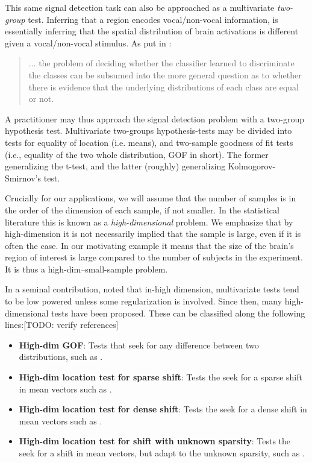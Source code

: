 \documentclass[onecolumn,draftclsnofoot]{IEEEtran}
\begin{document}
This same signal detection task can also be approached as a multivariate \emph{two-group} test.
Inferring that a region encodes vocal/non-vocal information, is essentially inferring that the spatial distribution of brain activations is different given a vocal/non-vocal stimulus. 
As put in \cite{pereira_machine_2009}: 
\begin{quote}
	... the problem of deciding whether the classifier learned to discriminate the classes can be subsumed into the more general question as to whether there is evidence that the underlying distributions of each class are equal or not.
\end{quote}
A practitioner may thus approach the signal detection problem with a two-group hypothesis test.
Multivariate two-groups hypothesis-tests may be divided into tests for equality of location (i.e. means), and two-sample goodness of fit tests (i.e., equality of the two whole distribution, GOF in short).
The former generalizing the t-test, and the latter (roughly) generalizing Kolmogorov-Smirnov's test.


Crucially for our applications, we will assume that the number of samples is in the order of the dimension of each sample, if not smaller. 
In the statistical literature this is known as a \emph{high-dimensional} problem. 
We emphasize that by high-dimension it is not necessarily implied that the sample is large, even if it is often the case. 
In our motivating example it means that the size of the brain's region of interest is large compared to the number of subjects in the experiment. 
It is thus a high-dim--small-sample problem. 

In a seminal contribution, \cite{bai1996effect} noted that in-high dimension, multivariate tests tend to be low powered unless some regularization is involved. 
Since then, many high-dimensional tests have been proposed. 
These can be classified along the following lines:[TODO: verify references]
\begin{itemize}
	\item \textbf{High-dim GOF}: Tests that seek for any difference between two distributions, such as  \cite{hall2002permutation,szekely_brownian_2009,gretton_kernel_2012-1}.
	
	\item \textbf{High-dim location test for sparse shift}: Tests the seek for a sparse shift in mean vectors such as \cite{tony2014two,chang2014simulation}.
	
	\item \textbf{High-dim location test for dense shift}: Tests the seek for a dense shift in mean vectors such as  \cite{dempster1958high,bai1996effect,schafer_shrinkage_2005,goeman2006testing,srivastava_multivariate_2007,lopes2011more,nishiyama2013testing,thulin2014high,shen2015adaptive,xu2016adaptive,zhang2016high}.
	
	\item \textbf{High-dim location test for shift with unknown sparsity}: Tests the seek for a shift in mean vectors, but adapt to the unknown sparsity, such as \cite{donoho2004higher,zhong2013tests,moscovich2016exact}.
	
\end{itemize}
\end{document}
